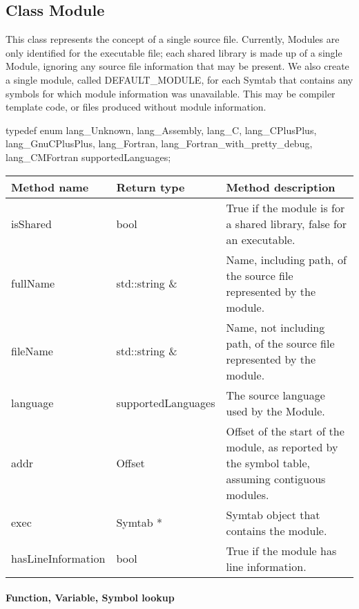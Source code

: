 \subsection{Class Module}\label{Module}
This class represents the concept of a single source file. Currently, Modules are only identified for the executable file; each shared library is made up of a single Module, ignoring any source file information that may be present. We also create a single module, called DEFAULT\_MODULE, for each Symtab that contains any symbols for which module information was unavailable. This may be compiler template code, or files produced without module information. 

\begin{apient}
typedef enum {
    lang_Unknown,
    lang_Assembly,
    lang_C,
    lang_CPlusPlus,
    lang_GnuCPlusPlus,
    lang_Fortran,
    lang_Fortran_with_pretty_debug,
    lang_CMFortran 
} supportedLanguages;
\end{apient}

\begin{tabular}{|p{1.25in}|p{1.25in}|p{3in}|}
	\hline
	Method name & Return type & Method description \\
	\hline
	isShared & bool & True if the module is for a shared library, false for an executable. \\
	fullName & std::string \& & Name, including path, of the source file represented by the module. \\
	fileName & std::string \& & Name, not including path, of the source file represented by the module. \\
	language & supportedLanguages & The source language used by the Module. \\
	addr & Offset & Offset of the start of the module, as reported by the symbol table, assuming contiguous modules. \\
	exec & Symtab * & Symtab object that contains the module. \\
	hasLineInformation & bool & True if the module has line information. \\
	\hline
\end{tabular}


\paragraph{Function, Variable, Symbol lookup}

